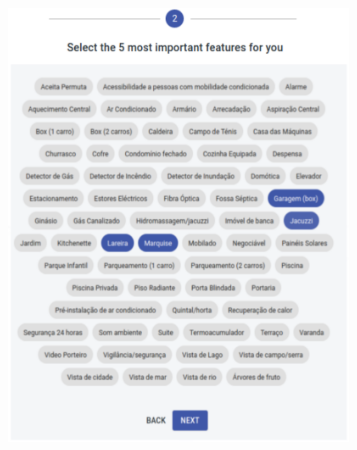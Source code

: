 \begin{figure}[h]
\begin{subfigure}[b]{0.3\textwidth}
        \includegraphics[width=0.99\textwidth]{Chapters/img/backend/ui_stepper_2.png}
        \caption{\centering}
        \label{fig:ui-stepper-2}
    \end{subfigure}
    \hfill
    \begin{subfigure}[b]{0.3\textwidth}
        \centering

\end{subfigure}
\end{figure}
